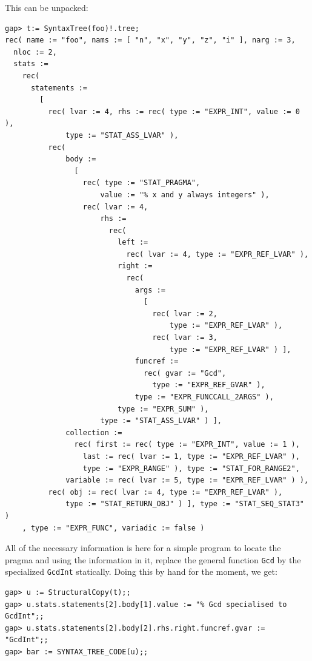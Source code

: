 \documentclass{deliverablereport}
\begin{document}
This can be unpacked:
\begin{Small}
\begin{verbatim}
gap> t:= SyntaxTree(foo)!.tree;
rec( name := "foo", nams := [ "n", "x", "y", "z", "i" ], narg := 3, 
  nloc := 2, 
  stats := 
    rec( 
      statements := 
        [ 
          rec( lvar := 4, rhs := rec( type := "EXPR_INT", value := 0 ), 
              type := "STAT_ASS_LVAR" ), 
          rec( 
              body := 
                [ 
                  rec( type := "STAT_PRAGMA", 
                      value := "% x and y always integers" ), 
                  rec( lvar := 4, 
                      rhs := 
                        rec( 
                          left := 
                            rec( lvar := 4, type := "EXPR_REF_LVAR" ), 
                          right := 
                            rec( 
                              args := 
                                [ 
                                  rec( lvar := 2, 
                                      type := "EXPR_REF_LVAR" ), 
                                  rec( lvar := 3, 
                                      type := "EXPR_REF_LVAR" ) ], 
                              funcref := 
                                rec( gvar := "Gcd", 
                                  type := "EXPR_REF_GVAR" ), 
                              type := "EXPR_FUNCCALL_2ARGS" ), 
                          type := "EXPR_SUM" ), 
                      type := "STAT_ASS_LVAR" ) ], 
              collection := 
                rec( first := rec( type := "EXPR_INT", value := 1 ), 
                  last := rec( lvar := 1, type := "EXPR_REF_LVAR" ), 
                  type := "EXPR_RANGE" ), type := "STAT_FOR_RANGE2", 
              variable := rec( lvar := 5, type := "EXPR_REF_LVAR" ) ), 
          rec( obj := rec( lvar := 4, type := "EXPR_REF_LVAR" ), 
              type := "STAT_RETURN_OBJ" ) ], type := "STAT_SEQ_STAT3" )
    , type := "EXPR_FUNC", variadic := false )
\end{verbatim}
\end{Small}

All of the necessary information is here for a simple \GAP program to
locate the pragma and using the information in it, replace the general
function \verb|Gcd| by the specialized \verb|GcdInt| statically.
Doing this by hand for the moment, we get:
\begin{verbatim}
gap> u := StructuralCopy(t);;
gap> u.stats.statements[2].body[1].value := "% Gcd specialised to GcdInt";;
gap> u.stats.statements[2].body[2].rhs.right.funcref.gvar := "GcdInt";;
gap> bar := SYNTAX_TREE_CODE(u);;
\end{verbatim}
\end{document}
